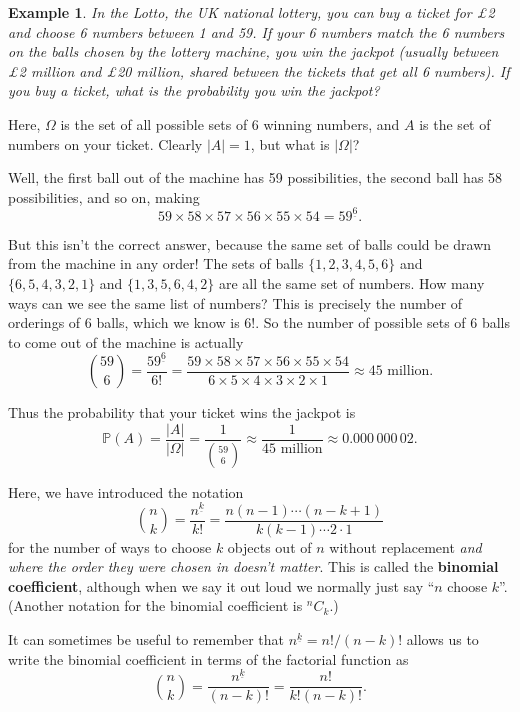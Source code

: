 \documentclass[
  a4paper,
]{book}
\theoremstyle{definition}
\theoremstyle{definition}
\newtheorem{example}{Example}[chapter]
\theoremstyle{definition}
\theoremstyle{definition}
\theoremstyle{remark}
\begin{document}
\begin{example}
\protect\hypertarget{exm:lotto}{}\label{exm:lotto}\emph{In the Lotto, the UK national lottery, you can buy a ticket for £2 and choose 6 numbers between 1 and 59. If your 6 numbers match the 6 numbers on the balls chosen by the lottery machine, you win the jackpot (usually between £2 million and £20 million, shared between the tickets that get all 6 numbers). If you buy a ticket, what is the probability you win the jackpot?}

Here, \(\Omega\) is the set of all possible sets of 6 winning numbers, and \(A\) is the set of numbers on your ticket. Clearly \(|A| = 1\), but what is \(|\Omega|\)?

Well, the first ball out of the machine has 59 possibilities, the second ball has 58 possibilities, and so on, making
\[ 59 \times 58 \times 57 \times 56 \times 55 \times 54 = {59}^{\underline{6}} . \]

But this isn't the correct answer, because the same set of balls could be drawn from the machine in any order! The sets of balls \(\{1,2,3,4,5,6\}\) and \(\{6,5,4,3,2,1\}\) and \(\{1,3,5,6,4,2\}\) are all the same set of numbers. How many ways can we see the same list of numbers? This is precisely the number of orderings of 6 balls, which we know is \(6!\). So the number of possible sets of 6 balls to come out of the machine is actually
\[ \binom{59}{6} = \frac{{59}^{\underline{6}}}{6!} = \frac{59 \times 58 \times 57 \times 56 \times 55 \times 54}{6\times5\times4\times3\times2\times1} \approx 45 \text{ million} . \]

Thus the probability that your ticket wins the jackpot is
\[ \mathbb P(A) = \frac{|A|}{|\Omega|} = \frac{1}{\binom{59}{6}} \approx \frac{1}{45 \text{ million}} \approx 0.000\,000\,02 . \]
\end{example}

Here, we have introduced the notation
\[ \binom{n}{k} = \frac{{n}^{\underline{k}}}{k!} = \frac{n(n-1) \cdots (n-k+1)}{k(k-1)\cdots2\cdot1}  \]
for the number of ways to choose \(k\) objects out of \(n\) without replacement \emph{and where the order they were chosen in doesn't matter}. This is called the \textbf{binomial coefficient}, although when we say it out loud we normally just say ``\(n\) choose \(k\)''. (Another notation for the binomial coefficient is \({}^n C_k\).)

It can sometimes be useful to remember that \({n}^{\underline{k}} = n!/(n-k)!\) allows us to write the binomial coefficient in terms of the factorial function as
\[ \binom nk = \frac{{n}^{\underline{k}}}{(n-k)!} = \frac{n!}{k!(n-k)!} . \]
\end{document}
